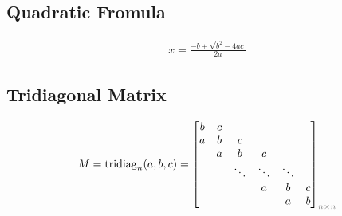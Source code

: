 \subsection{Quadratic Fromula}
\begin{align*}
    x = \frac{-b\pm\sqrt{b^2 - 4ac}}{2a}
\end{align*}

\subsection{Tridiagonal Matrix}
\begin{align*}
    M = \mathrm{tridiag}_{n}(a, b, c) =
    \begin{bmatrix}
        b & c &        &        &        &   \\
        a & b & c      &        &        &   \\
        & a & b      & c      &        &   \\
        &   & \ddots & \ddots & \ddots &   \\
        &   &        & a      & b      & c \\
        &   &        &        & a      & b
    \end{bmatrix}_{\color{gray}n\times n}
\end{align*}
